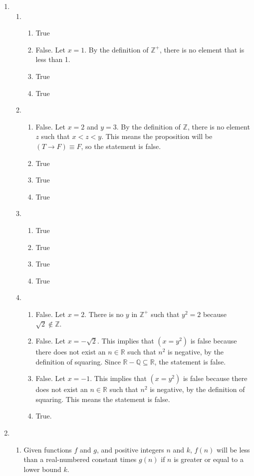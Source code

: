\documentclass{article}
\newcommand{\R}{\mathbb{R}}
\newcommand{\Z}{\mathbb{Z}}
\newcommand{\Q}{\mathbb{Q}}
\begin{document}
\begin{enumerate}
	\item \begin{enumerate}
		      \item \begin{enumerate}
			            \item True
			            \item False. Let $x = 1$. By the definition of $\Z^+$, there is no
			                  element that is less than 1.
			            \item True
			            \item True
		            \end{enumerate}
		      \item \begin{enumerate}
			            \item False. Let $x=2$ and $y=3$. By the definition of $\Z$, there is
			                  no element $z$ such that $x < z < y$. This means the proposition
			                  will be $(T \to F) \equiv F$, so the statement is false.
			            \item True
			            \item True
			            \item True
		            \end{enumerate}
		      \item \begin{enumerate}
			            \item True
			            \item True
			            \item True
			            \item True
		            \end{enumerate}
		      \item \begin{enumerate}
			            \item False. Let $x=2$. There is no $y$ in $\Z^+$ such that $y^2=2$
			                  because $\sqrt{2} \notin \Z$.
			            \item False. Let $x = -\sqrt 2$. This implies that $(x = y^2)$ is
			                  false because there does not exist an $n \in \R$ such that $n^2$
			                  is negative, by the definition of squaring. Since
			                  $\R - \Q \subseteq \R$, the statement is false.
			            \item False. Let $x = -1$. This implies that $(x = y^2)$ is
			                  false because there does not exist an $n \in \R$ such that $n^2$
			                  is negative, by the definition of squaring. This means the
			                  statement is false.
			            \item True.
		            \end{enumerate}
	      \end{enumerate}
	\item \begin{enumerate}
		      \item Given functions $f$ and $g$, and positive integers $n$ and $k$,
		            $f(n)$ will be less than a real-numbered constant times
		            $g(n)$ if $n$ is greater or equal to a lower bound $k$.


\end{enumerate}
\end{enumerate}
\end{document}

